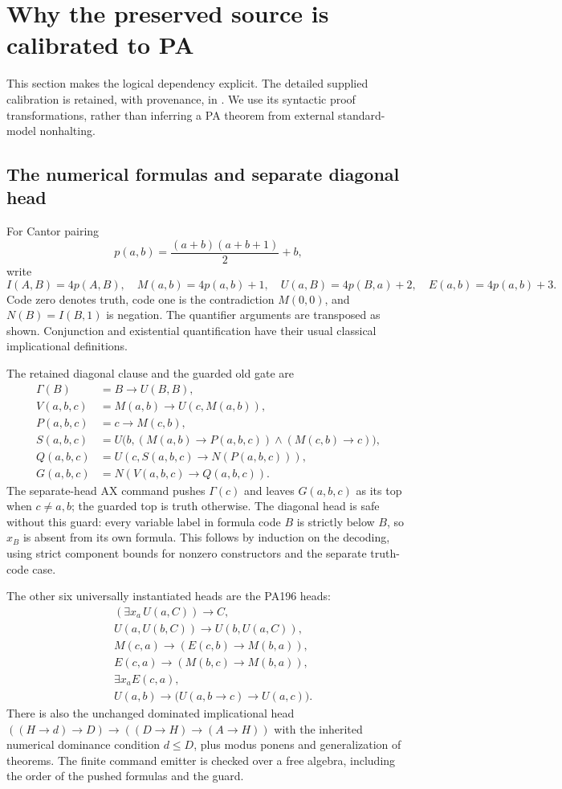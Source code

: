 \section{Why the preserved source is calibrated to PA}
\label{sec:calibration}

This section makes the logical dependency explicit. The detailed supplied
calibration is retained, with provenance, in .
We use its syntactic proof transformations, rather than inferring a PA theorem
from external standard-model nonhalting.

\subsection{The numerical formulas and separate diagonal head}

For Cantor pairing
\[
 p(a,b)=\frac{(a+b)(a+b+1)}2+b,
\]
write
\[
 I(A,B)=4p(A,B),\quad M(a,b)=4p(a,b)+1,\quad
 U(a,B)=4p(B,a)+2,\quad E(a,b)=4p(a,b)+3.
\]
Code zero denotes truth, code one is the contradiction $M(0,0)$, and
$N(B)=I(B,1)$ is negation. The quantifier arguments are transposed as shown.
Conjunction and existential quantification have their usual classical
implicational definitions.

The retained diagonal clause and the guarded old gate are
\begin{align*}
 \Gamma(B)&=B\to U(B,B),\\
 V(a,b,c)&=M(a,b)\to U(c,M(a,b)),\\
 P(a,b,c)&=c\to M(c,b),\\
 S(a,b,c)&=U\bigl(b,(M(a,b)\to P(a,b,c))\wedge(M(c,b)\to c)\bigr),\\
 Q(a,b,c)&=U(c,S(a,b,c)\to N(P(a,b,c))),\\
 G(a,b,c)&=N(V(a,b,c)\to Q(a,b,c)).
\end{align*}
The separate-head AX command pushes $\Gamma(c)$ and leaves $G(a,b,c)$
as its top when $c\ne a,b$; the guarded top is truth otherwise.
The diagonal head is safe without this guard: every variable label in
formula code $B$ is strictly below $B$, so $x_B$ is absent from its own
formula. This follows by induction on the decoding, using strict component
bounds for nonzero constructors and the separate truth-code case.

The other six universally instantiated heads are the PA196 heads:
\begin{align*}
 &(\exists x_a\,U(a,C))\to C,\\
 &U(a,U(b,C))\to U(b,U(a,C)),\\
 &M(c,a)\to(E(c,b)\to M(b,a)),\\
 &E(c,a)\to(M(b,c)\to M(b,a)),\\
 &\exists x_a E(c,a),\\
 &U(a,b)\to\bigl(U(a,b\to c)\to U(a,c)\bigr).
\end{align*}
There is also the unchanged dominated implicational head
$((H\to d)\to D)\to((D\to H)\to(A\to H))$ with the inherited numerical
dominance condition $d\le D$, plus modus ponens and generalization of theorems.
The finite command emitter is checked over a free algebra, including the
order of the pushed formulas and the guard.

